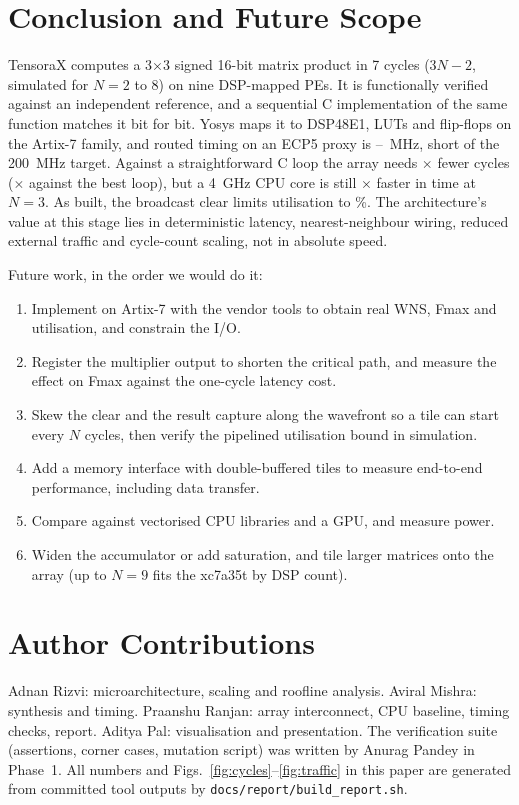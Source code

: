 \documentclass[conference]{IEEEtran}
\newcommand{\tx}{TensoraX\xspace}
\begin{document}
\section{Conclusion and Future Scope}
\tx computes a 3$\times$3 signed 16-bit matrix product in 7 cycles ($3N-2$, simulated for $N=2$ to $8$) on nine DSP-mapped PEs. It is functionally verified against an independent reference, and a sequential C implementation of the same function matches it bit for bit. Yosys maps it to \XDsp DSP48E1, \XLut LUTs and \XFF flip-flops on the Artix-7 family, and routed timing on an ECP5 proxy is \FmaxLo--\FmaxHi~MHz, short of the 200~MHz target. Against a straightforward C loop the array needs \HeadS{}$\times$ fewer cycles (\BestS{}$\times$ against the best loop), but a 4~GHz CPU core is still \CpuFasterHead{}$\times$ faster in time at $N=3$. As built, the broadcast clear limits utilisation to \EtaThree{}\%. The architecture's value at this stage lies in deterministic latency, nearest-neighbour wiring, reduced external traffic and cycle-count scaling, not in absolute speed.

Future work, in the order we would do it:
\begin{enumerate}
\item Implement on Artix-7 with the vendor tools to obtain real WNS, Fmax and utilisation, and constrain the I/O.
\item Register the multiplier output to shorten the critical path, and measure the effect on Fmax against the one-cycle latency cost.
\item Skew the clear and the result capture along the wavefront so a tile can start every $N$ cycles, then verify the pipelined utilisation bound in simulation.
\item Add a memory interface with double-buffered tiles to measure end-to-end performance, including data transfer.
\item Compare against vectorised CPU libraries and a GPU, and measure power.
\item Widen the accumulator or add saturation, and tile larger matrices onto the array (up to $N=9$ fits the xc7a35t by DSP count).
\end{enumerate}

\section*{Author Contributions}
Adnan Rizvi: microarchitecture, scaling and roofline analysis. Aviral Mishra: synthesis and timing. Praanshu Ranjan: array interconnect, CPU baseline, timing checks, report. Aditya Pal: visualisation and presentation. The verification suite (assertions, corner cases, mutation script) was written by Anurag Pandey in Phase~1. All numbers and Figs.~\ref{fig:cycles}--\ref{fig:traffic} in this paper are generated from committed tool outputs by \texttt{docs/report/build\_report.sh}.
\end{document}
